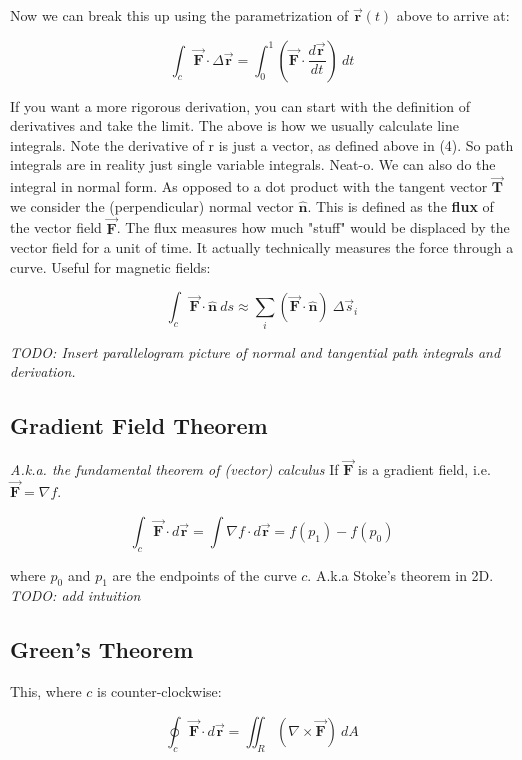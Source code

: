\documentclass{article}
\newcommand{\bm}[1]{\mathbf{#1}}
\newcommand{\vf}[1]{\vec{\mathbf{#1}}}
\newcommand{\norm}{\hat{\bm{n}}}
\begin{document}
Now we can break this up using the parametrization of $\vf{r}(t)$ above to arrive at:

\begin{equation}
    \int_c \vf{F} \cdot \Delta \vf{r} = \int_{0}^{1} (\vf{F} \cdot \frac{d\vf{r}}{dt})\ dt
\end{equation}

If you want a more rigorous derivation, you can start with the definition of derivatives and take the limit. The above is how we usually calculate line integrals. Note the derivative of r is just a vector, as defined above in (4). So path integrals are in reality just single variable integrals. Neat-o.
\vskip 0.1in
We can also do the integral in normal form. As opposed to a dot product with the tangent vector $\vf{T}$ we consider the (perpendicular) normal vector $\norm$. This is defined as the \textbf{flux} of the vector field $\vf{F}$. The flux measures how much "stuff" would be displaced by the vector field for a unit of time. It actually technically measures the force through a curve. Useful for magnetic fields:

\begin{equation}
    \int_c \vf{F} \cdot \norm\ ds \approx \sum_i (\vf{F} \cdot \norm)\ \Delta \vec{s}_i
\end{equation}

\textit{TODO: Insert parallelogram picture of normal and tangential path integrals and derivation.}

\subsection{Gradient Field Theorem}
\textit{A.k.a. the fundamental theorem of (vector) calculus}
If $\vf{F}$ is a gradient field, i.e. $\vf{F} = \nabla f$.

\begin{equation}
    \int_c \vf{F} \cdot d\vf{r} = \int \nabla f \cdot d\vf{r} = f(p_1) - f(p_0)
\end{equation}

where $p_0$ and $p_1$ are the endpoints of the curve $c$. A.k.a Stoke's theorem in 2D. \textit{TODO: add intuition}

\subsection{Green's Theorem}
This, where $c$ is counter-clockwise:

\begin{equation}
    \oint_c \vf{F} \cdot d\vf{r} = \iint_R (\nabla \times \vf{F})\ dA
\end{equation}
\end{document}
